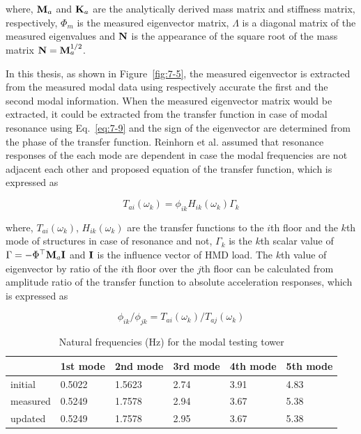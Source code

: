 where, $\mathbf{M}_{a}$ and $\mathbf{K}_{a}$ are the analytically derived mass matrix and stiffness matrix, respectively, $\Phi_{m}$ is the measured eigenvector matrix, $\Lambda$ is a diagonal matrix of the measured eigenvalues and $\mathbf{N}$ is the appearance of the square root of the mass matrix $\mathbf{N} = \mathbf{M}_{a}^{1/2}$.

In this thesis, as shown in Figure~\ref{fig:7-5}, the measured eigenvector is extracted from the measured modal data using respectively accurate the first and the second modal information. When the measured eigenvector matrix would be extracted, it could be extracted from the transfer function in case of modal resonance using Eq.~\eqref{eq:7-9} and the sign of the eigenvector are determined from the phase of the transfer function. Reinhorn et al. assumed that resonance responses of the each mode are dependent in case the modal frequencies are not adjacent each other and proposed equation of the transfer function, which is expressed as

\begin{equation} \label{eq:7-9}
T_{ai}\left(\omega_{k}\right) = \phi_{ik}H_{ik}\left(\omega_{k}\right)\Gamma_{k}
\end{equation}

where, $T_{ai}\left(\omega_{k}\right)$, $H_{ik}\left(\omega_{k}\right)$ are the transfer functions to the $i$th floor and the $k$th mode of structures in case of resonance and not, $\Gamma_{k}$ is the $k$th scalar value of $\Gamma = -\Phi^{\top}\mathbf{M}_{a}\mathbf{I}$ and $\mathbf{I}$ is the influence vector of HMD load. The $k$th value of eigenvector by ratio of the $i$th floor over the $j$th floor can be calculated from amplitude ratio of the transfer function to absolute acceleration responses, which is expressed as

\begin{equation}\label{eq:7-10}
\phi_{ik}/\phi_{jk} = T_{ai}\left(\omega_{k}\right)/T_{aj}\left(\omega_{k}\right)
\end{equation}

\begin{table}[ht]
\centering
\begin{tabularx}{\textwidth}{@{}X|X|X|X|X|X@{}}
\toprule[1pt]\midrule[0.3pt]
& 1st mode & 2nd mode & 3rd mode & 4th mode & 5th mode\\ \midrule[0.3pt]
initial & 0.5022 & 1.5623 & 2.74 & 3.91 & 4.83\\
measured& 0.5249 & 1.7578 & 2.94 & 3.67 & 5.38\\
updated & 0.5249 & 1.7578 & 2.95 & 3.67 & 5.38\\
\bottomrule
\end{tabularx}
\caption{Natural frequencies (Hz) for the modal testing tower}
\label{tab:7-3}
\end{table}

